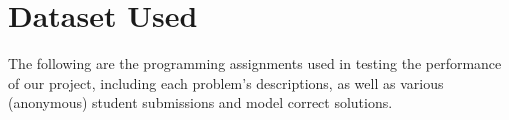 \chapter{Dataset Used}
The following are the programming assignments used in testing the performance of our project,
including each problem's descriptions, as well as various (anonymous) student submissions and
model correct solutions.
